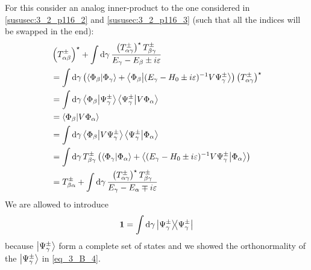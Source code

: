For this consider an analog inner-product to the one considered in \ref{sususec:3_2_p116_2} and \ref{sususec:3_2_p116_3} (such that all the indices will be swapped in the end):
\begin{align*}
	&\left(T_{\alpha\beta}^\pm\right)^\star+\int\dd{\gamma}\dfrac{\left(T_{\alpha\gamma}^\pm\right)^\star T_{\beta\gamma}^\pm}{E_\gamma-E_\beta\pm i \varepsilon}\\
	&=\int\dd{\gamma}\left(\braket{\Phi_\beta}{\Phi_\gamma}+\braket{\Phi_\beta}{(E_\gamma-H_0\pm i \varepsilon)^{-1}V\Psi_\gamma^\pm}\right)\left(T_{\alpha\gamma}^\pm\right)^\star\\
	&=\int\dd{\gamma}\braket{\Phi_\beta}{\Psi_\gamma^\pm}\braket{\Psi_\gamma^\pm}{V\Phi_\alpha}\\
	&=\braket{\Phi_\beta}{V\Phi_\alpha}\\
	&=\int\dd{\gamma}\braket{\Phi_\beta}{V\Psi_\gamma^\pm}\braket{\Psi_\gamma^\pm}{\Phi_\alpha}\\
	&=\int\dd{\gamma} T_{\beta\gamma}^\pm\left(\braket{\Phi_\gamma}{\Phi_\alpha}+\braket{(E_\gamma-H_0\pm i \varepsilon)^{-1}V\Psi_\gamma^\pm}{\Phi_\alpha}\right)\\
	&=T_{\beta\alpha}^\pm+\int\dd{\gamma}\dfrac{\left(T_{\alpha\gamma}^\pm\right)^\star T_{\beta\gamma}^\pm}{E_\gamma-E_\alpha\mp i \varepsilon}
\end{align*}
We are allowed to introduce \[\mathbf{1}=\int \dd{\gamma} \ketbra{\Psi_\gamma^\pm}{\Psi_\gamma^\pm} \]
because $\ket{\Psi_\gamma^\pm}$ form a complete set of states and we showed the orthonormality of the $\ket{\Psi_\gamma^\pm}$ in \ref{eq_3_B_4}.

